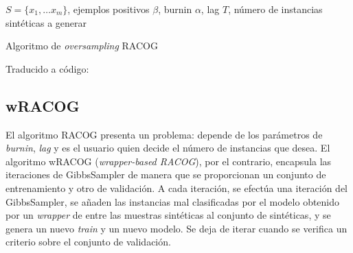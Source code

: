 \begin{algorithm}[H]
\begin{algorithmic}[1]
  \REQUIRE $S = \{x_1, \ldots x_m\}$, ejemplos positivos
  \REQUIRE $\beta$, burnin
  \REQUIRE $\alpha$, lag
  \REQUIRE $T$, número de instancias sintéticas a generar
  \NEWLINE
    \NEWLINE
    \ENDIF
  \ENDFOR
  \NEWLINE
\end{algorithmic}
\caption{Algoritmo de \textit{oversampling} RACOG}
\label{alg:racog}
\end{algorithm}

Traducido a código:



\subsection{wRACOG}
El algoritmo RACOG presenta un problema: depende de los parámetros de \textit{burnin}, \textit{lag} y
es el usuario quien decide el número de instancias que desea. El algoritmo wRACOG (\textit{wrapper-based RACOG}),
por el contrario, encapsula las iteraciones de GibbsSampler de manera que se proporcionan un conjunto de 
entrenamiento y otro de validación. A cada iteración, se efectúa una iteración del GibbsSampler, se añaden 
las instancias mal clasificadas por el modelo obtenido por un \textit{wrapper} de entre las muestras sintéticas
al conjunto de sintéticas, y se genera un nuevo \textit{train} y un nuevo modelo. Se deja de iterar 
cuando se verifica un criterio sobre el conjunto de validación.

